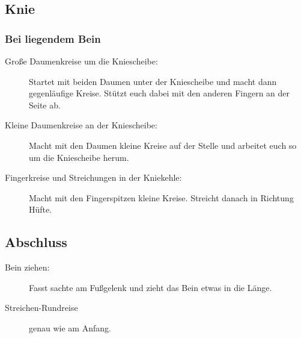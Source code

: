 \subsection{Knie}

\subsubsection{Bei liegendem Bein}

\begin{description}
  \item [Große Daumenkreise um die Kniescheibe:] Startet mit beiden Daumen unter der Kniescheibe und macht dann gegenläufige Kreise. Stützt euch dabei mit den anderen Fingern an der Seite ab.
  \item [Kleine Daumenkreise an der Kniescheibe:] Macht mit den Daumen kleine Kreise auf der Stelle und arbeitet euch so um die Kniescheibe herum.
  \item [Fingerkreise und Streichungen in der Kniekehle:] Macht mit den Fingerspitzen kleine Kreise. Streicht danach in Richtung Hüfte.
\end{description}


\subsection{Abschluss}

\begin{description}
  \item [Bein ziehen:] Fasst sachte am Fußgelenk und zieht das Bein etwas in die Länge.
  \item [Streichen-Rundreise] genau wie am Anfang.
\end{description}
